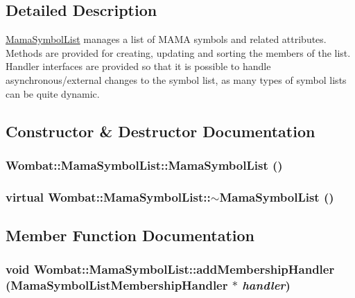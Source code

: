 \subsection{Detailed Description}
\hyperlink{classWombat_1_1MamaSymbolList}{MamaSymbolList} manages a list of MAMA symbols and related attributes. Methods are provided for creating, updating and sorting the members of the list. Handler interfaces are provided so that it is possible to handle asynchronous/external changes to the symbol list, as many types of symbol lists can be quite dynamic. 

\subsection{Constructor \& Destructor Documentation}
\hypertarget{classWombat_1_1MamaSymbolList_ad1f53322a205ead3d1097e99912ab27b}{
\subsubsection[{MamaSymbolList}]{\setlength{\rightskip}{0pt plus 5cm}Wombat::MamaSymbolList::MamaSymbolList ()}}
\label{classWombat_1_1MamaSymbolList_ad1f53322a205ead3d1097e99912ab27b}
\hypertarget{classWombat_1_1MamaSymbolList_af454a9e117d313041d33753b9eff4903}{
\subsubsection[{$\sim$MamaSymbolList}]{\setlength{\rightskip}{0pt plus 5cm}virtual Wombat::MamaSymbolList::$\sim$MamaSymbolList ()}}
\label{classWombat_1_1MamaSymbolList_af454a9e117d313041d33753b9eff4903}


\subsection{Member Function Documentation}
\hypertarget{classWombat_1_1MamaSymbolList_af47e92be8419abad5697fbab50d50586}{
\subsubsection[{addMembershipHandler}]{\setlength{\rightskip}{0pt plus 5cm}void Wombat::MamaSymbolList::addMembershipHandler ({\bf MamaSymbolListMembershipHandler} $\ast$ {\em handler})}}
\label{classWombat_1_1MamaSymbolList_af47e92be8419abad5697fbab50d50586}


